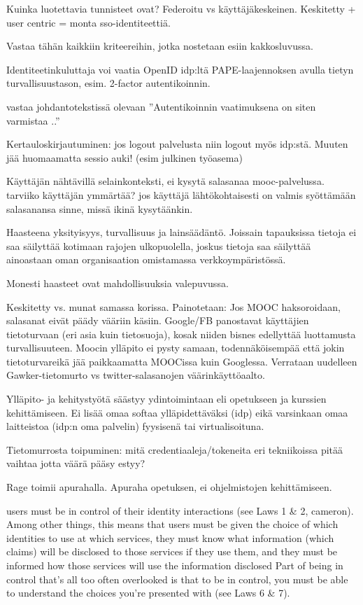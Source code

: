 \documentclass[finnish,gradu]{tktltiki}
\begin{document}
  Kuinka luotettavia tunnisteet ovat? Federoitu vs käyttäjäkeskeinen. Keskitetty + user centric = monta sso-identiteettiä.

  Vastaa tähän kaikkiin kriteereihin, jotka nostetaan esiin kakkosluvussa.

  Identiteetinkuluttaja voi vaatia OpenID idp:ltä PAPE-laajennoksen avulla tietyn turvallisuustason, esim. 2-factor autentikoinnin.

  vastaa johdantotekstissä olevaan ''Autentikoinnin vaatimuksena on siten varmistaa ..''

  Kertauloskirjautuminen: jos logout palvelusta niin logout myös idp:stä. Muuten jää huomaamatta sessio auki! (esim julkinen työasema)

  Käyttäjän nähtävillä selainkonteksti, ei kysytä salasanaa mooc-palvelussa. tarviiko käyttäjän ymmärtää? jos käyttäjä lähtökohtaisesti on valmis syöttämään salasanansa sinne, missä ikinä kysytäänkin.

  Haasteena yksityisyys, turvallisuus ja lainsäädäntö. Joissain tapauksissa tietoja ei saa säilyttää kotimaan rajojen ulkopuolella, joskus tietoja saa säilyttää ainoastaan oman organisaation omistamassa verkkoympäristössä.

  Monesti haasteet ovat mahdollisuuksia valepuvussa.

  Keskitetty vs. munat samassa korissa. Painotetaan: Jos MOOC haksoroidaan, salasanat eivät päädy vääriin käsiin. Google/FB panostavat käyttäjien tietoturvaan (eri asia kuin tietosuoja), kosak niiden bisnes edellyttää luottamusta turvallisuuteen. Moocin ylläpito ei pysty samaan, todennäköisempää että jokin tietoturvareikä jää paikkaamatta MOOCissa kuin Googlessa. Verrataan uudelleen Gawker-tietomurto vs twitter-salasanojen väärinkäyttöaalto.

  Ylläpito- ja kehitystyötä säästyy ydintoimintaan eli opetukseen ja kurssien kehittämiseen. Ei lisää omaa softaa ylläpidettäväksi (idp) eikä varsinkaan omaa laitteistoa (idp:n oma palvelin) fyysisenä tai virtualisoituna.

  Tietomurrosta toipuminen: mitä credentiaaleja/tokeneita eri tekniikoissa pitää vaihtaa jotta väärä pääsy estyy?

  Rage toimii apurahalla. Apuraha opetuksen, ei ohjelmistojen kehittämiseen.

  users must be in control of their identity interactions (see Laws 1 \& 2, cameron). Among other things, this means that users must be given the choice of which identities to use at which services, they must know what information (which claims) will be disclosed to those services if they use them, and they must be informed how those services will use the information disclosed
  Part of being in control that’s all too often overlooked is that to be in control, you must be able to understand the choices you’re presented with (see Laws 6 \& 7).
\end{document}
